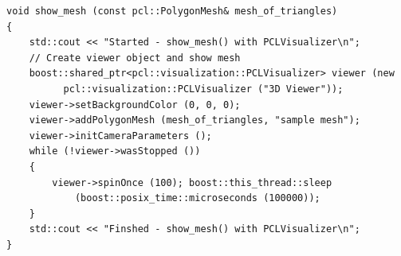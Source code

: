 \newpage
\begin{lstlisting}[label=lstPrikaz,caption={Izvorni kod funkcije
\texttt{show\_mesh()} }]
void show_mesh (const pcl::PolygonMesh& mesh_of_triangles)
{
    std::cout << "Started - show_mesh() with PCLVisualizer\n";
    // Create viewer object and show mesh
    boost::shared_ptr<pcl::visualization::PCLVisualizer> viewer (new
          pcl::visualization::PCLVisualizer ("3D Viewer"));
    viewer->setBackgroundColor (0, 0, 0);
    viewer->addPolygonMesh (mesh_of_triangles, "sample mesh");
    viewer->initCameraParameters (); 
    while (!viewer->wasStopped ())
    {
        viewer->spinOnce (100); boost::this_thread::sleep
            (boost::posix_time::microseconds (100000));
    }
    std::cout << "Finshed - show_mesh() with PCLVisualizer\n";
}
\end{lstlisting}




